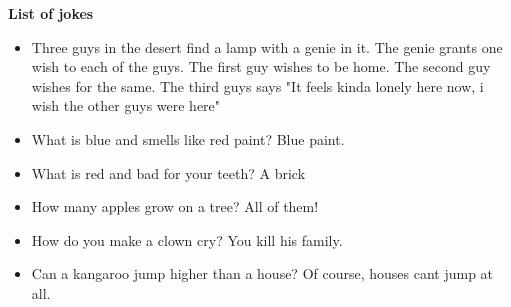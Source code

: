 \documentclass[../../../main.tex]{subfiles}
\begin{document}
\textbf{List of jokes}
\begin{itemize}
    \item Three guys in the desert find a lamp with a genie in it. The genie grants one wish to each of the guys. The first guy wishes to be home. The second guy wishes for the same. The third guys says "It feels kinda lonely here now, i wish the other guys were here"
    \item What is blue and smells like red paint? Blue paint.
    \item What is red and bad for your teeth? A brick
    \item How many apples grow on a tree? All of them!
    \item How do you make a clown cry? You kill his family.
    \item Can a kangaroo jump higher than a house? Of course, houses cant jump at all.
\end{itemize}
\end{document}
